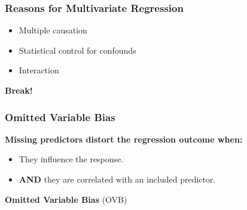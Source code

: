 \documentclass{beamer}
\begin{document}
\begin{frame}
  \frametitle{Reasons for Multivariate Regression}
  \begin{itemize}
    \item Multiple causation
    \item Statistical control for confounds
    \item Interaction
  \end{itemize}
\end{frame}

\begin{frame}
    \centering
    \huge\color{purple}\textbf{Break!}
\end{frame}

\begin{frame}
  \frametitle{Omitted Variable Bias}
  \textbf{Missing predictors distort the regression outcome when:}
  \begin{itemize}
    \item They influence the response.
    \item \textbf{AND} they are correlated with an included predictor.
  \end{itemize}

\vspace{0.5cm}
  
  \begin{block}{}
  \centering
    \large\textbf{Omitted Variable Bias} (OVB)
  \end{block}
\end{frame}

\end{document}
